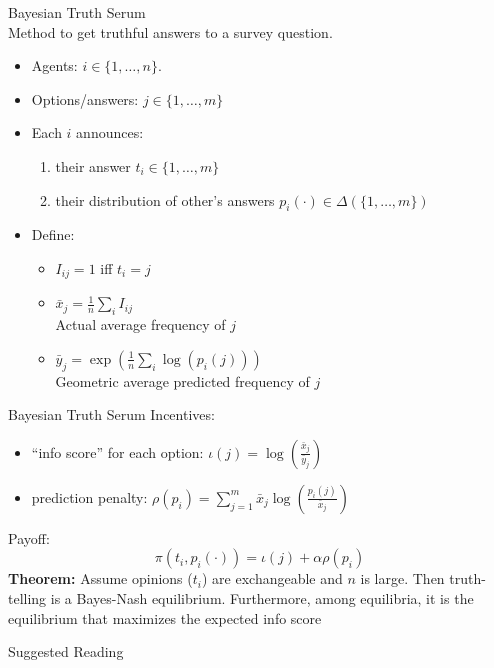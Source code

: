 \begin{frame}{Bayesian Truth Serum}
    \cite{Prelec2004}\\
    Method to get truthful answers to a survey question.
    \begin{itemize}
        \item Agents: $i\in\{1,\ldots,n\}$.
        \item Options/answers: $j\in\{1,\ldots,m\}$
        \item Each $i$ announces:
        \begin{enumerate}
            \item their answer $t_i\in\{1,\ldots,m\}$
            \item their distribution of other's answers $p_i(\cdot)\in \Delta(\{1,\ldots,m\})$
        \end{enumerate}
        \item Define:
        \begin{itemize}
            \item $I_{ij}=1$ iff $t_i = j$
            \item $\bar{x}_j = \frac{1}{n} \sum_i I_{ij}$\\
            Actual average frequency of $j$
            \item $\bar{y}_j=\exp \left(\frac{1}{n}\sum_i \log (p_i(j)) \right)$\\
            Geometric average predicted frequency of $j$
        \end{itemize}        
    \end{itemize}
\end{frame}

\begin{frame}{Bayesian Truth Serum}
    Incentives:
    \begin{itemize}
        \item ``info score'' for each option: $\iota(j) = \log \left( \frac{\bar{x}_j}{\bar{y}_j} \right)$
        \item prediction penalty: $\rho(p_i) = \sum_{j=1}^m \bar{x}_j \log \left( \frac{p_i(j)}{\bar{x}_j} \right)$
    \end{itemize}
    Payoff:
    $$
    \pi(t_i,p_i(\cdot)) = \iota(j) + \alpha \rho(p_i)
    $$
    \textbf{Theorem:} Assume opinions ($t_i$) are exchangeable and $n$ is large. Then truth-telling is a Bayes-Nash equilibrium. Furthermore, among equilibria, it is the equilibrium that maximizes the expected info score
\end{frame}

\nocite{}

\begin{frame}[allowframebreaks]{Suggested Reading}
    
\end{frame}


